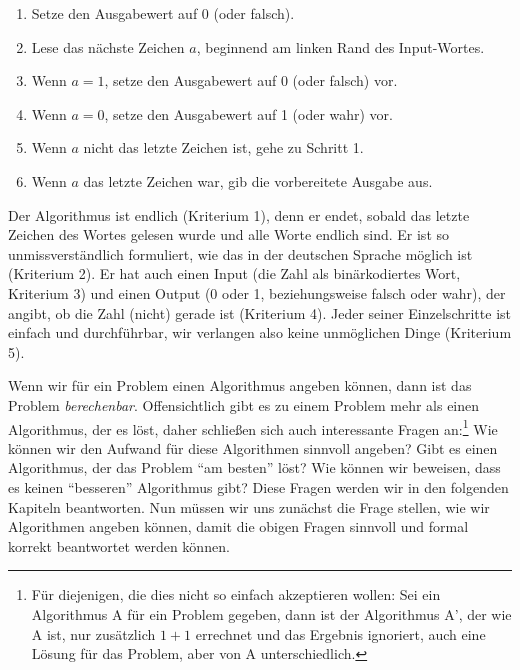 \begin{enumerate}
    \item Setze den Ausgabewert auf 0 (oder falsch).
    \item Lese das nächste Zeichen $a$, beginnend am linken Rand des Input-Wortes.
    \item Wenn $a = 1$, setze den Ausgabewert auf 0 (oder falsch) vor.
    \item Wenn $a = 0$, setze den Ausgabewert auf 1 (oder wahr) vor.
    \item Wenn $a$ nicht das letzte Zeichen ist, gehe zu Schritt 1.
    \item Wenn $a$ das letzte Zeichen war, gib die vorbereitete Ausgabe aus.
\end{enumerate}

Der Algorithmus ist endlich (Kriterium 1),
denn er endet,
sobald das letzte Zeichen des Wortes gelesen wurde und alle Worte endlich sind.
Er ist so unmissverständlich formuliert,
wie das in der deutschen Sprache möglich ist (Kriterium 2).
Er hat auch einen Input (die Zahl als binärkodiertes Wort, Kriterium 3)
und einen Output (0 oder 1, beziehungsweise falsch oder wahr),
der angibt, ob die Zahl (nicht) gerade ist (Kriterium 4).
Jeder seiner Einzelschritte ist einfach und durchführbar,
wir verlangen also keine unmöglichen Dinge (Kriterium 5).

Wenn wir für ein Problem einen Algorithmus angeben können,
dann ist das Problem \emph{berechenbar}.
Offensichtlich gibt es zu einem Problem mehr als einen Algorithmus,
der es löst, daher schließen sich auch interessante Fragen an:\footnote{Für diejenigen, die dies nicht so einfach akzeptieren wollen:
Sei ein Algorithmus A für ein Problem gegeben, dann ist der Algorithmus A', der wie A ist,
nur zusätzlich $1+1$ errechnet und das Ergebnis ignoriert,
auch eine Lösung für das Problem, aber von A unterschiedlich.}
Wie können wir den Aufwand für diese Algorithmen sinnvoll angeben?
Gibt es einen Algorithmus, der das Problem ``am besten'' löst?
Wie können wir beweisen, dass es keinen ``besseren'' Algorithmus gibt?
Diese Fragen werden wir in den folgenden Kapiteln beantworten.
Nun müssen wir uns zunächst die Frage stellen, wie wir Algorithmen angeben können,
damit die obigen Fragen sinnvoll und formal korrekt beantwortet werden können.

